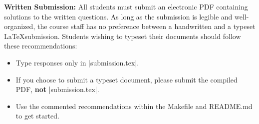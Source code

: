 {\bf Written Submission:}
All students must submit an electronic PDF containing solutions to the written
questions. As long as the submission is legible and well-organized, the course
staff has no preference between a handwritten and a typeset \LaTeX submission.
Students wishing to typeset their documents should follow these recommendations:
\begin{itemize}
  \item Type responses only in |submission.tex|.
  \item If you choose to submit a typeset document, please submit the compiled
  PDF, {\bf not} |submission.tex|.
  \item Use the commented recommendations within the Makefile and README.md to
  get started.
\end{itemize}
